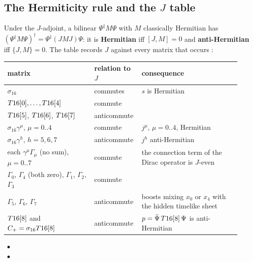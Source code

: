 \subsection{The Hermiticity rule and the \texorpdfstring{$J$}{J} table}
\label{sec:6.8}

Under the $J$-adjoint, a bilinear $\Psi^{\ddagger}M\Psi$ with $M$ classically Hermitian has
$(\Psi^{\ddagger}M\Psi)^{\dagger}=\Psi^{\ddagger}(JMJ)\Psi$: it is \textbf{Hermitian} iff $[J,M]=0$ and
\textbf{anti-Hermitian} iff $\{J,M\}=0$. The table records $J$ against every matrix that occurs
:

{\small
\begin{longtable}{@{}p{0.36\linewidth}p{0.17\linewidth}p{0.41\linewidth}@{}}
\toprule
\raggedright matrix & \raggedright relation to $J$ & \raggedright consequence \tabularnewline
\midrule
\endhead
\raggedright $\sigma_{16}$ & \raggedright commutes & \raggedright $s$ is Hermitian \tabularnewline
\raggedright $T16[0],\dots,T16[4]$ & \raggedright commute & \tabularnewline
\raggedright $T16[5]$, $T16[6]$, $T16[7]$ & \raggedright anticommute & \tabularnewline
\raggedright $\sigma_{16}\gamma^\mu$, $\mu=0..4$ & \raggedright commute & \raggedright $j^\mu$, $\mu=0..4$, Hermitian \tabularnewline
\raggedright $\sigma_{16}\gamma^h$, $h=5,6,7$ & \raggedright anticommute & \raggedright $j^h$ anti-Hermitian \tabularnewline
\raggedright each $\gamma^\mu\Gamma_\mu$ (no sum), $\mu=0..7$ & \raggedright commute & \raggedright the connection term of the Dirac operator is $J$-even \tabularnewline
\raggedright $\Gamma_0$, $\Gamma_4$ (both zero), $\Gamma_1$, $\Gamma_2$, $\Gamma_3$ & \raggedright commute & \tabularnewline
\raggedright $\Gamma_5$, $\Gamma_6$, $\Gamma_7$ & \raggedright anticommute & \raggedright boosts mixing $x_0$ or $x_4$ with the hidden timelike sheet \tabularnewline
\raggedright $T16[8]$ and $C_+=\sigma_{16}T16[8]$ & \raggedright anticommute & \raggedright $p=\bar\Psi\,T16[8]\,\Psi$ is anti-Hermitian \tabularnewline
\bottomrule
\end{longtable}
}
\begin{itemize}
  \item {}
  \item {}
\end{itemize}
